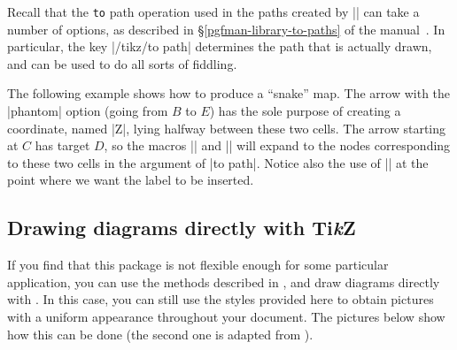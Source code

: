 \documentclass[a4paper]{ltxdoc}
\begin{document}
Recall that the \texttt{to} path operation used in the paths created by
|\arrow| can take a number of options, as described in 
\S\ref*{pgfman-library-to-paths} of the \pgfname{} manual~\cite{pgfman}.  In particular, the
key |/tikz/to path| determines the path that is actually drawn, and
can be used to do all sorts of fiddling.

\begin{codeexample}[]
\end{codeexample}%

The following example shows how to produce a ``snake'' map.  The arrow
with the |phantom| option (going from $B$ to $E$) has the sole purpose
of creating a coordinate, named |Z|, lying halfway between these two
cells.  The arrow starting at $C$ has target $D$, so the macros
|\tikztostart| and |\tikztotarget| will expand to the nodes
corresponding to these two cells in the argument of |to path|.  Notice
also the use of |\tikztonodes| at the point where we want the label to
be inserted.
\begin{codeexample}[]
\end{codeexample}

\subsection{Drawing diagrams directly with Ti\emph{k}Z}
\label{sec:draw-diagr-directly}

If you find that this package is not flexible enough for some
particular application, you can use the methods described in
\cite{lenders}, \cite{milne} and draw diagrams directly with
\tikzname.  In this case, you can still use the styles provided here
to obtain pictures with a uniform appearance throughout your document.
The pictures below show how this can be done (the second one is
adapted from \cite{milne}).
\end{document}
